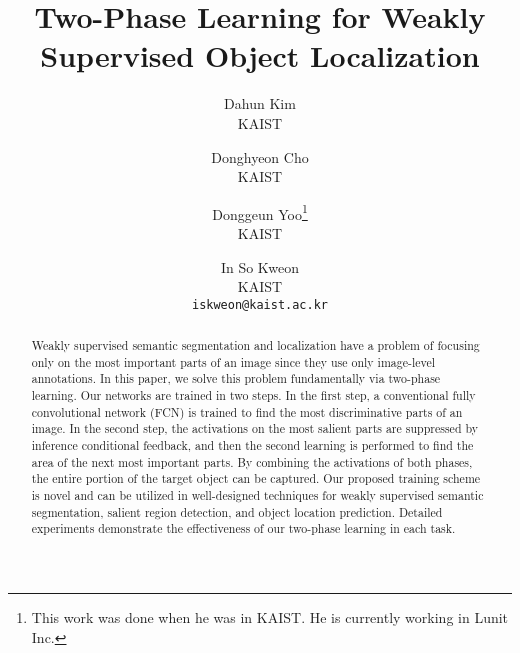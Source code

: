 \documentclass[10pt,twocolumn,letterpaper]{article}
\begin{document}
\title{Two-Phase Learning for Weakly Supervised Object Localization}

\author{\hspace{-0.1in}Dahun Kim\\
\hspace{-0.1in}KAIST\\
\hspace{-0.1in}{\tt\small mcahny@kaist.ac.kr}
\and
\hspace{-0.1in}Donghyeon Cho\\
\hspace{-0.1in}KAIST\\
\hspace{-0.1in}{\tt\small cdh12242@gmail.com}
\and 
\hspace{-0.1in}Donggeun Yoo\thanks{This work was done when he was in KAIST. He is currently working in Lunit Inc.}\\
\hspace{-0.1in}KAIST\\
\hspace{-0.1in}{\tt\small dgyoo@rcv.kaist.ac.kr}
\and
In So Kweon\\
KAIST\\
{\tt\small iskweon@kaist.ac.kr}
}

\maketitle


\begin{abstract}
Weakly supervised semantic segmentation and localization have a problem of focusing only on the most important parts of an image since they use only image-level annotations. In this paper, we solve this problem fundamentally via two-phase learning. Our networks are trained in two steps. In the first step, a conventional fully convolutional network (FCN) is trained to find the most discriminative parts of an image. In the second step, the activations on the most salient parts are suppressed by inference conditional feedback, and then the second learning is performed to find the area of the next most important parts. By combining the activations of both phases, the entire portion of the target object can be captured. Our proposed training scheme is novel and can be utilized in well-designed techniques for weakly supervised semantic segmentation, salient region detection, and object location prediction. Detailed experiments demonstrate the effectiveness of our two-phase learning in each task. 
\end{abstract}
\end{document}
